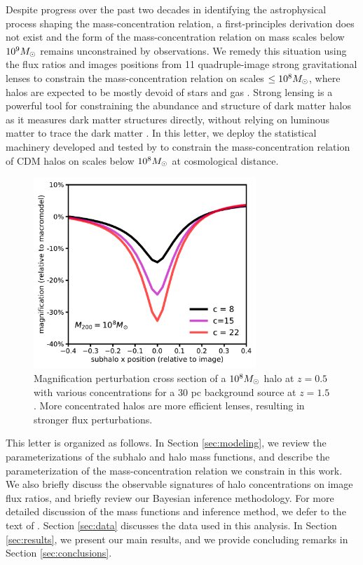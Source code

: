 Despite progress over the past two decades in identifying the astrophysical process shaping the mass-concentration relation, a first-principles derivation does not exist and the form of the mass-concentration relation on mass scales below $10^{9} {M_{\odot}}$ remains unconstrained by observations. We remedy this situation using the flux ratios and images positions from 11 quadruple-image strong gravitational lenses to constrain the mass-concentration relation on scales $\leq 10^{8} {M_{\odot}}$, where halos are expected to be mostly devoid of stars and gas \citep{Sawala++15}. Strong lensing is a powerful tool for constraining the abundance and structure of dark matter halos as it measures dark matter structures directly, without relying on luminous matter to trace the dark matter \citep{D+K02,Veg++14,Nierenberg++14,Birrer++17a,Hsueh++19,Gilman++19b}. In this letter, we deploy the statistical machinery developed and tested by \citet{Gilman++19} to constrain the mass-concentration relation of CDM halos on scales below $10^8 {M_{\odot}}$ at cosmological distance. 
\begin{figure}
	\centering
	\includegraphics[clip,trim=0cm 0cm 0cm
	0cm,width=0.75\textwidth,keepaspectratio]{./figures_mcrelation/concentration_cross_section.pdf}
	\caption[Magnification cross section as a function of halo concentration]{\label{fig:cross} Magnification perturbation cross section of a $10^{8} {M_{\odot}}$ halo at $z=0.5$ with various concentrations for a 30 pc background source at $z=1.5$. More concentrated halos are more efficient lenses, resulting in stronger flux perturbations.}
\end{figure}	

This letter is organized as follows. In Section \ref{sec:modeling}, we review the parameterizations of the subhalo and halo mass functions, and describe the parameterization of the mass-concentration relation we constrain in this work. We also briefly discuss the observable signatures of halo concentrations on image flux ratios, and briefly review our Bayesian inference methodology. For more detailed discussion of the mass functions and inference method, we defer to the text of \citet{Gilman++19b}. Section \ref{sec:data} discusses the data used in this analysis. In Section \ref{sec:results}, we present our main results, and we provide concluding remarks in Section \ref{sec:conclusions}. 


